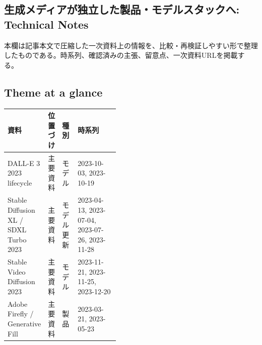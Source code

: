 \subsection*{生成メディアが独立した製品・モデルスタックへ: Technical Notes}
本欄は記事本文で圧縮した一次資料上の情報を、比較・再検証しやすい形で整理したものである。時系列、確認済みの主張、留意点、一次資料URLを掲載する。
\smallskip
{}\par
\medskip
\subsection*{Theme at a glance}
\begin{center}
\footnotesize
\begin{tabularx}{\linewidth}{@{}p{0.20\linewidth}p{0.10\linewidth}p{0.14\linewidth}X@{}}
\toprule
資料 & 位置づけ & 種別 & 時系列 \\
\midrule
DALL-E 3 2023 lifecycle & 主要資料 & モデル & 2023-10-03, 2023-10-19 \\
Stable Diffusion XL / SDXL Turbo 2023 & 主要資料 & モデル更新 & 2023-04-13, 2023-07-04, 2023-07-26, 2023-11-28 \\
Stable Video Diffusion 2023 & 主要資料 & モデル & 2023-11-21, 2023-11-25, 2023-12-20 \\
Adobe Firefly / Generative Fill & 主要資料 & 製品 & 2023-03-21, 2023-05-23 \\
\bottomrule
\end{tabularx}
\end{center}
\normalsize

